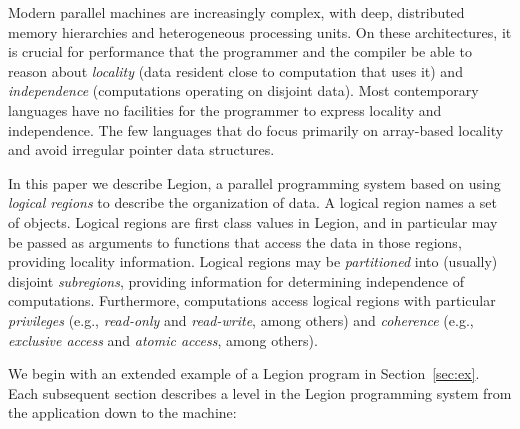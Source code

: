\documentclass[conference]{IEEEtran}
\begin{document}
Modern parallel machines are increasingly complex, with deep,
distributed memory hierarchies and heterogeneous processing units.  On
these architectures, it is crucial for performance that the programmer
and the compiler be able to reason about {\em locality} (data resident
close to computation that uses it) and {\em independence} (computations
operating on disjoint data).  Most contemporary
languages have no facilities for the programmer to express locality
and independence.  The few languages that do focus primarily on
array-based locality \cite{Fatahalian06,CHAPEL04,UPC99} and 
avoid irregular pointer data structures.

In this paper we describe Legion, a parallel programming system based
on using {\em logical regions} to describe the organization of data.
A logical region names a set of objects.  Logical regions are first
class values in Legion, and in particular may be passed as arguments
to functions that access the data in those regions, providing locality
information.  Logical regions may be {\em partitioned} into (usually)
disjoint {\em subregions}, providing information for determining independence of computations.  Furthermore,
computations access logical regions with particular {\em privileges} (e.g., {\em
  read-only} and {\em read-write}, among others) 
and {\em coherence} (e.g., {\em exclusive access} and {\em atomic access}, among others).

We begin with an extended example of a Legion program in Section~\ref{sec:ex}.
Each subsequent section describes a level in the Legion programming
system from the application down to the machine:
 
\end{document}
